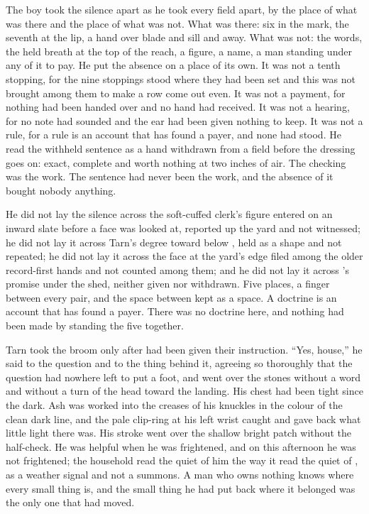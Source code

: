 The boy took the silence apart as he took every field apart, by the place of what was there and the place of what was not. What was there: six in the mark, the seventh at the lip, a hand over blade and sill and away. What was not: the words, the held breath at the top of the reach, a figure, a name, a man standing under any of it to pay. He put the absence on a place of its own. It was not a tenth stopping, for the nine stoppings stood where they had been set and this was not brought among them to make a row come out even. It was not a payment, for nothing had been handed over and no hand had received. It was not a hearing, for no note had sounded and the ear had been given nothing to keep. It was not a rule, for a rule is an account that has found a payer, and none had stood. He read the withheld sentence as a hand withdrawn from a field before the dressing goes on: exact, complete and worth nothing at two inches of air. The checking was the work. The sentence had never been the work, and the absence of it bought nobody anything.

He did not lay the silence across the soft-cuffed clerk's figure entered on an inward slate before a face was looked at, reported up the yard and not witnessed; he did not lay it across Tarn's degree toward  below , held as a shape and not repeated; he did not lay it across the face at the yard's edge filed among the older record-first hands and not counted among them; and he did not lay it across 's promise under the shed, neither given nor withdrawn. Five places, a finger between every pair, and the space between kept as a space. A doctrine is an account that has found a payer. There was no doctrine here, and nothing had been made by standing the five together.

Tarn took the broom only after  had been given their instruction. “Yes, house,” he said to the question and to the thing behind it, agreeing so thoroughly that the question had nowhere left to put a foot, and went over the stones without a word and without a turn of the head toward the landing. His chest had been tight since the dark. Ash was worked into the creases of his knuckles in the colour of the clean dark line, and the pale clip-ring at his left wrist caught and gave back what little light there was. His stroke went over the shallow bright patch without the half-check. He was helpful when he was frightened, and on this afternoon he was not frightened; the household read the quiet of him the way it read the quiet of , as a weather signal and not a summons. A man who owns nothing knows where every small thing is, and the small thing he had put back where it belonged was the only one that had moved.

